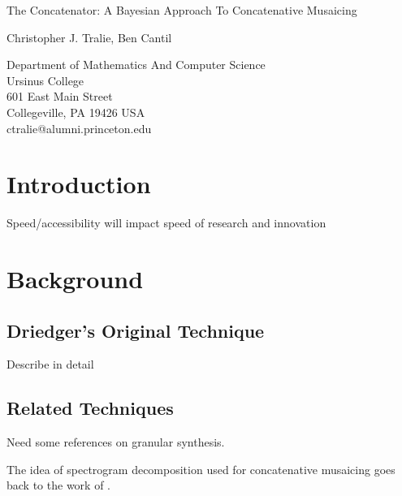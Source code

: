\documentclass[letterpaper, 12pt]{article}
\begin{document}
{\cmjTitle The Concatenator: A Bayesian Approach To Concatenative Musaicing}
\vspace*{24pt}


{\cmjAuthor Christopher J. Tralie, Ben Cantil}	%
 
\begin{cmjAuthorAddress}
	Department of Mathematics And Computer Science\\
	Ursinus College\\
	601 East Main Street\\
	Collegeville, PA 19426 USA\\		%
	ctralie@alumni.princeton.edu
\end{cmjAuthorAddress}


\begin{abstract}

\end{abstract}

\section{Introduction}

Speed/accessibility will impact speed of research and innovation

\section{Background}


\subsection{Driedger's Original Technique}

Describe in detail

\subsection{Related Techniques}

Need some references on granular synthesis.

The idea of spectrogram decomposition used for concatenative musaicing goes back to the work of \cite{burred2013cross}.
\end{document}
